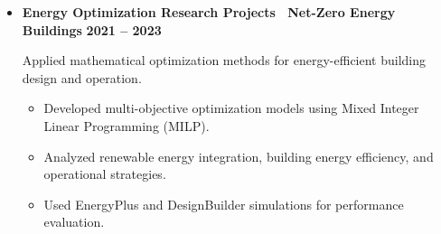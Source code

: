 \documentclass[letter,20pt]{article}
\begin{document}
\begin{itemize}
\vspace{4pt}


Developed a machine learning-based fault detection and diagnosis framework for CO$_2$ refrigeration systems.



\begin{itemize}
[
noitemsep,
leftmargin=4ex
]


\item
Designed tree-based machine learning models for fault classification and diagnosis.

\item
Optimized sensor selection strategies to reduce monitoring requirements while maintaining diagnostic accuracy.

\item
Achieved approximately 99\% F1-score using Random Forest and XGBoost-based models.

\item
Evaluated model robustness under measurement noise and sensor failure scenarios.


\end{itemize}



\vspace{10pt}



\item[]
\textbf{
Energy Optimization Research Projects \textbar\ Net-Zero Energy Buildings
}
\hfill
\textbf{2021 -- 2023}


\vspace{4pt}


Applied mathematical optimization methods for energy-efficient building design and operation.



\begin{itemize}
[
noitemsep,
leftmargin=4ex
]

\item
Developed multi-objective optimization models using Mixed Integer Linear Programming (MILP).

\item
Analyzed renewable energy integration, building energy efficiency, and operational strategies.

\item
Used EnergyPlus and DesignBuilder simulations for performance evaluation.

\end{itemize}



\end{itemize}
\end{document}
